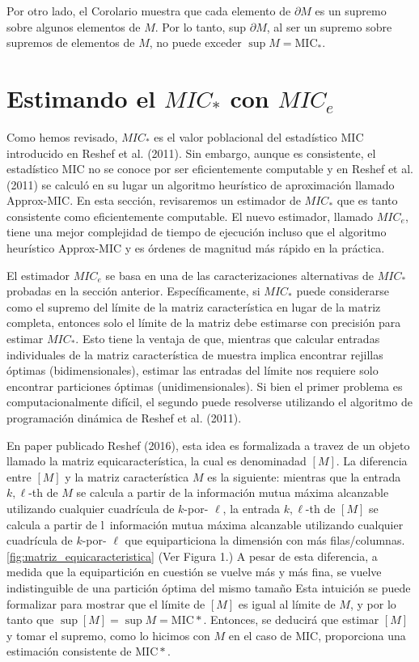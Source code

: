 	Por otro lado, el Corolario muestra que cada elemento de $\partial M$ es un supremo sobre algunos elementos de $M$. Por lo tanto, sup $\partial M$, al ser un supremo sobre supremos de elementos de $M$, no puede exceder $\sup M=\mathrm{MIC}_*$.


	\section{Estimando el $MIC_*$ con $MIC_e$}

	Como hemos revisado, $MIC_*$ es el valor poblacional del estad\'istico MIC introducido en Reshef et al. (2011). Sin embargo, aunque es consistente, el estad\'istico MIC no se conoce por ser eficientemente computable y en Reshef et al. (2011) se calcul\'o en su lugar un algoritmo heur\'istico de aproximaci\'on llamado Approx-MIC. En esta secci\'on, revisaremos un estimador de $MIC_*$ que es tanto consistente como eficientemente computable. El nuevo estimador, llamado $MIC_e$, tiene una mejor complejidad de tiempo de ejecuci\'on incluso que el algoritmo heur\'istico Approx-MIC y es \'ordenes de magnitud m\'as r\'apido en la pr\'actica.

	El estimador $MIC_e$ se basa en una de las caracterizaciones alternativas de $MIC_*$ probadas en la secci\'on anterior. Espec\'ificamente, si $MIC_*$ puede considerarse como el supremo del l\'imite de la matriz caracter\'istica en lugar de la matriz completa, entonces solo el l\'imite de la matriz debe estimarse con precisi\'on para estimar $MIC_*$. Esto tiene la ventaja de que, mientras que calcular entradas individuales de la matriz caracter\'istica de muestra implica encontrar rejillas \'optimas (bidimensionales), estimar las entradas del l\'imite nos requiere solo encontrar particiones \'optimas (unidimensionales). Si bien el primer problema es computacionalmente dif\'icil, el segundo puede resolverse utilizando el algoritmo de programaci\'on din\'amica de Reshef et al. (2011).

	En paper publicado Reshef (2016), esta idea es formalizada a travez de un objeto llamado la matriz equicaracter\'istica, la cual es denominadad $[M]$. La diferencia entre $[M]$ y la matriz caracter\'istica $M$ es la siguiente: mientras que la entrada $k, \ell$-th de $M$ se calcula a partir de la informaci\'on mutua m\'axima alcanzable utilizando cualquier cuadr\'icula de $k$-por- $\ell$, la entrada $k, \ell$-th de $[M]$ se calcula a partir de l\ informaci\'on mutua m\'axima alcanzable utilizando cualquier cuadr\'icula de $k$-por- $\ell$ que equiparticiona la dimensi\'on con m\'as filas/columnas. \ref{fig:matriz_equicaracteristica} (Ver Figura 1.) A pesar de esta diferencia, a medida que la equipartici\'on en cuesti\'on se vuelve m\'as y m\'as fina, se vuelve indistinguible de una partici\'on \'optima del mismo tama\~no Esta intuici\'on se puede formalizar para mostrar que el l\'imite de $[M]$ es igual al l\'imite de $M$, y por lo tanto que $\sup [M]=\sup M=\mathrm{MIC}*$. Entonces, se deducir\'a que estimar $[M]$ y tomar el supremo, como lo hicimos con $M$ en el caso de MIC, proporciona una estimaci\'on consistente de $\mathrm{MIC}*$.

